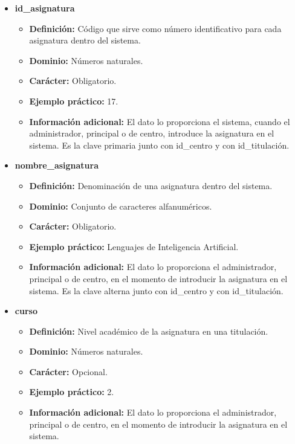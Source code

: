 \begin{description}
   \begin{itemize}
   \item \textbf{id\_asignatura}
      \begin{itemize}
         \item \textbf{Definición:} Código que sirve como número identificativo
         para cada asignatura dentro del sistema.
         \item \textbf{Dominio:} Números naturales.
         \item \textbf{Carácter:} Obligatorio.
         \item \textbf{Ejemplo práctico:} 17.
         \item \textbf{Información adicional:} El dato lo proporciona el sistema, cuando el administrador, principal o de centro, introduce la asignatura en el sistema. Es la clave primaria junto con id\_centro y con id\_titulación.
      \end{itemize}
   \item \textbf{nombre\_asignatura}
      \begin{itemize}
         \item \textbf{Definición:} Denominación de una asignatura dentro del sistema.
         \item \textbf{Dominio:} Conjunto de caracteres alfanuméricos.
         \item \textbf{Carácter:}  Obligatorio.
         \item \textbf{Ejemplo práctico:} Lenguajes de Inteligencia Artificial.
         \item \textbf{Información adicional:} El dato lo proporciona el administrador, principal o de
         centro, en el momento de introducir la asignatura en el sistema. Es la clave alterna junto con
         id\_centro y con id\_titulación.
      \end{itemize}
   \item \textbf{curso}
      \begin{itemize}
         \item \textbf{Definición:} Nivel académico de la asignatura en una titulación.
         \item \textbf{Dominio:} Números naturales.
         \item \textbf{Carácter:}  Opcional.
         \item \textbf{Ejemplo práctico:} 2.
         \item \textbf{Información adicional:} El dato lo proporciona el administrador, principal o de
         centro, en el momento de introducir la asignatura en el sistema.

\end{itemize}
\end{itemize}
\end{description}
